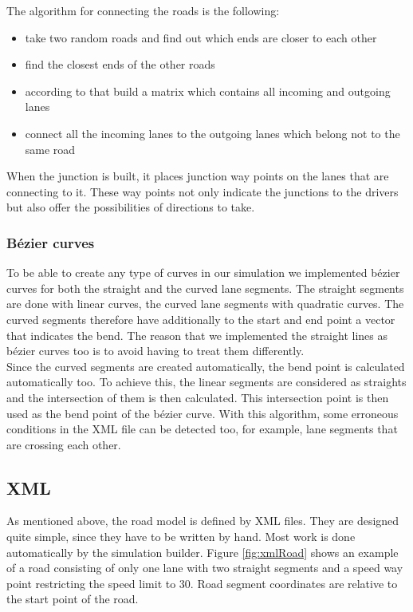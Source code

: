 \noindent The algorithm for connecting the roads is the following:
\begin{itemize}
\item take two random roads and find out which ends are closer to each other
\item find the closest ends of the other roads
\item according to that build a matrix which contains all incoming and outgoing lanes
\item connect all the incoming lanes to the outgoing lanes which belong not to the same road
\end{itemize}

\noindent When the junction is built, it places junction way points on the
lanes that are connecting to it. These way points not only indicate the
junctions to the drivers but also offer the possibilities of directions
to take.

\subsubsection{Bézier curves}
\label{sec:bezier}

To be able to create any type of curves in our simulation we implemented
bézier curves for both the straight and the curved lane segments. The 
straight segments are done with linear curves, the curved lane segments
with quadratic curves. The curved segments therefore have additionally
to the start and end point a vector that indicates the bend. The reason
that we implemented the straight lines as bézier curves too is to avoid
having to treat them differently.  \\

\noindent Since the curved segments are created automatically, the bend
point is calculated automatically too. To achieve this, the linear segments are 
considered as straights and the intersection of them is then calculated.
This intersection point is then used as the bend point of the bézier curve.
With this algorithm, some erroneous conditions in the XML file can be
detected too, for example, lane segments that are crossing each other.

\subsection{XML}
\label{sec:XML}

As mentioned above, the road model is defined by XML files. They are 
designed quite simple, since they have to be written by hand. Most work
is done automatically by the simulation builder. Figure 
\ref{fig:xmlRoad} shows an example of a road consisting of only one 
lane with two straight segments and a speed way point restricting the
speed limit to 30. Road segment coordinates are relative to the start
point of the road. \\

